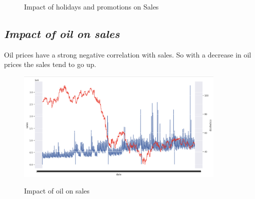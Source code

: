 \documentclass[12pt,a4paper]{cibb}
\begin{document}
\begin{figure}[h]
\hfill
{}
\hfill
{}
\hfill
\caption{Impact of holidays and promotions on Sales}
\end{figure}

\subsection{\bf \it Impact of oil on sales}
Oil prices have a strong negative correlation with sales. So with a decrease in oil prices the sales tend to go up.

\begin{figure}[h]
 \begin{center}
{\includegraphics[width=10cm]{sales_v_oil.png}}
\caption{Impact of oil on sales}
 \end{center}
\end{figure}
\end{document}
